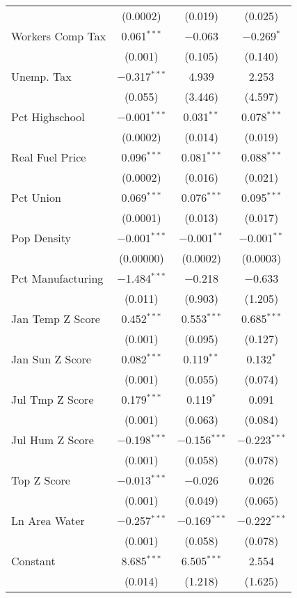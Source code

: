 \begin{table}[!htbp]
\begin{tabular}{@{\extracolsep{5pt}}lccc}
  & (0.0002) & (0.019) & (0.025) \\ 
  Workers Comp Tax & 0.061$^{***}$ & $-$0.063 & $-$0.269$^{*}$ \\ 
  & (0.001) & (0.105) & (0.140) \\ 
  Unemp. Tax & $-$0.317$^{***}$ & 4.939 & 2.253 \\ 
  & (0.055) & (3.446) & (4.597) \\ 
  Pct Highschool & $-$0.001$^{***}$ & 0.031$^{**}$ & 0.078$^{***}$ \\ 
  & (0.0002) & (0.014) & (0.019) \\ 
  Real Fuel Price & 0.096$^{***}$ & 0.081$^{***}$ & 0.088$^{***}$ \\ 
  & (0.0002) & (0.016) & (0.021) \\ 
  Pct Union & 0.069$^{***}$ & 0.076$^{***}$ & 0.095$^{***}$ \\ 
  & (0.0001) & (0.013) & (0.017) \\ 
  Pop Density & $-$0.001$^{***}$ & $-$0.001$^{**}$ & $-$0.001$^{**}$ \\ 
  & (0.00000) & (0.0002) & (0.0003) \\ 
  Pct Manufacturing & $-$1.484$^{***}$ & $-$0.218 & $-$0.633 \\ 
  & (0.011) & (0.903) & (1.205) \\ 
  Jan Temp Z Score & 0.452$^{***}$ & 0.553$^{***}$ & 0.685$^{***}$ \\ 
  & (0.001) & (0.095) & (0.127) \\ 
  Jan Sun Z Score & 0.082$^{***}$ & 0.119$^{**}$ & 0.132$^{*}$ \\ 
  & (0.001) & (0.055) & (0.074) \\ 
  Jul Tmp Z Score & 0.179$^{***}$ & 0.119$^{*}$ & 0.091 \\ 
  & (0.001) & (0.063) & (0.084) \\ 
  Jul Hum Z Score & $-$0.198$^{***}$ & $-$0.156$^{***}$ & $-$0.223$^{***}$ \\ 
  & (0.001) & (0.058) & (0.078) \\ 
  Top Z Score & $-$0.013$^{***}$ & $-$0.026 & 0.026 \\ 
  & (0.001) & (0.049) & (0.065) \\ 
  Ln Area Water & $-$0.257$^{***}$ & $-$0.169$^{***}$ & $-$0.222$^{***}$ \\ 
  & (0.001) & (0.058) & (0.078) \\ 
  Constant & 8.685$^{***}$ & 6.505$^{***}$ & 2.554 \\ 
  & (0.014) & (1.218) & (1.625) \\ 

\end{tabular}
\end{table}

